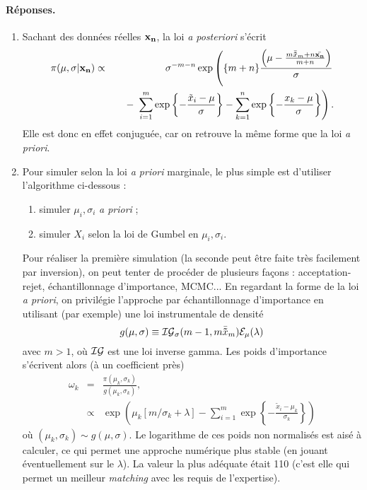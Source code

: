 \paragraph{\bf Réponses.}
\begin{enumerate}
\item Sachant des donn\'ees r\'eelles ${\bf x_n}$, la loi {\it a posteriori} s'\'ecrit
\begin{eqnarray*}
\pi(\mu,\sigma|{\bf x_n}) & \propto & {\displaystyle \sigma^{-m-n}\exp\left(\{m+n\}\frac{\left(\mu-\frac{m\bar{\bf\tilde{x}}_m + n\bar{\bf x_n}}{m+n}\right)}{\sigma} \right. }\\
& & {\displaystyle \ \ \ \left. - \ \sum\limits_{i=1}^{m} \exp\left\{-\frac{\tilde{x}_i-\mu}{\sigma}\right\}-\sum\limits_{k=1}^{n} \exp\left\{-\frac{x_k-\mu}{\sigma}\right\}\right).}
\end{eqnarray*}
Elle est donc en effet conjuguée, car on retrouve la même forme que la loi {\it a priori}. 
\item Pour simuler selon la loi {\it a priori} marginale, le plus simple est d'utiliser l'algorithme ci-dessous :
\begin{enumerate}
\item simuler $\mu_i,\sigma_i$ {\it a priori} ;
\item simuler $X_i$ selon la loi de Gumbel en  $\mu_i,\sigma_i$.
\end{enumerate}
Pour réaliser la première simulation (la seconde peut être faite très facilement par inversion), on peut tenter de procéder de plusieurs fa\c cons : acceptation-rejet, échantillonnage d'importance, MCMC... En regardant la forme de la loi {\it a priori}, on privilégie l'approche par échantillonnage d'importance en utilisant (par exemple) une loi instrumentale de densité
$$
g(\mu,\sigma) \equiv {\cal{IG}}_{\sigma}(m-1,m \bar{\bf\tilde{x}}_m) {\cal{E}}_{\mu}(\lambda)
$$
avec $m>1$, où ${\cal{IG}}$ est une loi inverse gamma. Les poids d'importance s'écrivent alors (à un coefficient près)
\begin{eqnarray*}
\omega_k & = & \frac{\pi(\mu_k,\sigma_k)}{g(\mu_k,\sigma_k)}, \\
& \propto & \exp\left(\mu_k\left[m/\sigma_k + \lambda\right] - \sum\limits_{i=1}^{m} \exp\left\{-\frac{\tilde{x}_i-\mu_k}{\sigma_k}\right\}\right)
\end{eqnarray*}
où  $(\mu_k,\sigma_k)\sim g(\mu,\sigma)$. Le logarithme de ces poids non normalisés est aisé à calculer, ce qui permet une approche numérique plus stable (en jouant éventuellement sur le $\lambda$).  La valeur la plus adéquate était 110 (c'est elle qui permet un meilleur {\it matching} avec les requis de l'expertise). 


\end{enumerate}
